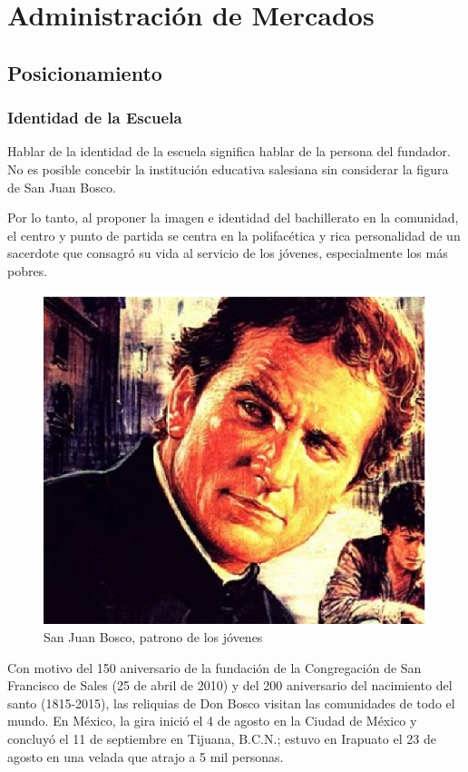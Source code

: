 \chapter{Administración de Mercados}

\section{Posicionamiento}

\subsection{Identidad de la Escuela}

Hablar de la identidad de la escuela significa hablar de la persona del fundador. No es posible concebir la institución educativa salesiana sin considerar la figura de San Juan Bosco.

Por lo tanto, al proponer la imagen e identidad del bachillerato en la comunidad, el centro y punto de partida se centra en la polifacética y rica personalidad de un sacerdote que consagró su vida al servicio de los jóvenes, especialmente los más pobres.

\begin{figure}
	\centering
	\includegraphics[scale=0.5]{images/san-juan-bosco}
	\caption{San Juan Bosco, patrono de los jóvenes}
	\label{fig:don-bosco}
\end{figure}

Con motivo del 150 aniversario de la fundación de la Congregación de San Francisco de Sales (25 de abril de 2010) y del 200 aniversario del nacimiento del santo (1815-2015), las reliquias de Don Bosco visitan las comunidades de todo el mundo. En México, la gira inició el 4 de agosto en la Ciudad de México y concluyó el 11 de septiembre en Tijuana, B.C.N.; estuvo en Irapuato el 23 de agosto en una velada que atrajo a 5 mil personas.

